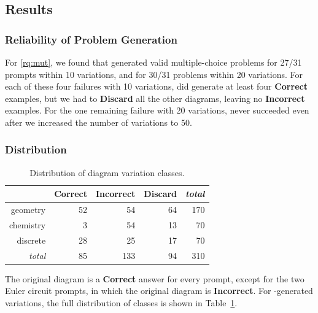 \subsection{Results}

\subsubsection{Reliability of Problem Generation}

For \ref{rq:mut}, we found that \Edgeworth generated valid multiple-choice problems for 27/31 prompts within 10 variations, and for 30/31 problems within 20 variations. For each of these four failures with 10 variations, \Edgeworth did generate at least four \textbf{Correct} examples, but we had to \textbf{Discard} all the other diagrams, leaving no \textbf{Incorrect} examples. For the one remaining failure with 20 variations, \Edgeworth never succeeded even after we increased the number of variations to 50.


\subsubsection{Distribution}

\begin{table}
    \centering
    \begin{tabular}{r|rrr|r}
        & \textbf{Correct} & \textbf{Incorrect} & \textbf{Discard} & \textit{total} \\
        \hline
        geometry & 52 & 54 & 64 & 170 \\
        chemistry & 3 & 54 & 13 & 70 \\
        discrete & 28 & 25 & 17 & 70 \\
        \hline
        \textit{total} & 85 & 133 & 94 & 310
    \end{tabular}
    \caption{Distribution of diagram variation classes.}
    \label{tab:distribution}
\end{table}

The original diagram is a \textbf{Correct} answer for every prompt, except for the two Euler circuit prompts, in which the original diagram is \textbf{Incorrect}. For \Edgeworth-generated variations, the full distribution of classes is shown in Table~\ref{tab:distribution}.

